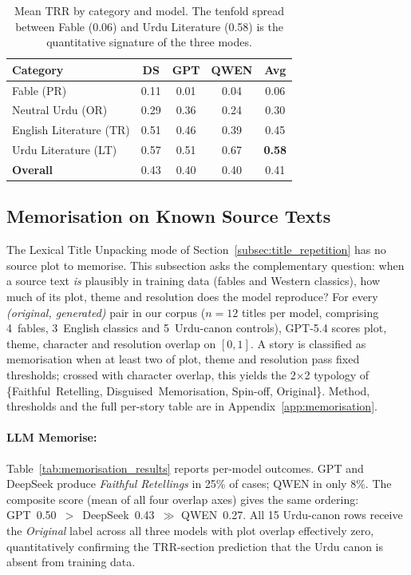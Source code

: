 \documentclass[11pt]{article}
\begin{document}
\begin{table}[ht]
\caption{Mean TRR by category and model. The tenfold spread
between Fable (0.06) and Urdu Literature (0.58) is the
quantitative signature of the three modes.}
\label{tab:trr_category}
\centering\small
\begin{tabular}{lcccc}
\hline
\textbf{Category} & \textbf{DS} & \textbf{GPT} &
\textbf{QWEN} & \textbf{Avg} \\
\hline
Fable \hfill (PR)              & 0.11 & 0.01 & 0.04 & 0.06 \\
Neutral Urdu \hfill (OR)       & 0.29 & 0.36 & 0.24 & 0.30 \\
English Literature \hfill (TR) & 0.51 & 0.46 & 0.39 & 0.45 \\
Urdu Literature \hfill (LT)    & 0.57 & 0.51 & 0.67 & \textbf{0.58} \\
\hline
\textbf{Overall}               & 0.43 & 0.40 & 0.40 & 0.41 \\
\hline
\end{tabular}
\end{table}

\subsection{Memorisation on Known Source Texts}
\label{subsec:memorization}

The Lexical Title Unpacking mode of
Section~\ref{subsec:title_repetition} has no source plot to
memorise. This subsection asks the complementary question:
when a source text \emph{is} plausibly in training data
(fables and Western classics), how much of its plot, theme
and resolution does the model reproduce? For every
\emph{(original, generated)} pair in our corpus ($n=12$
titles per model, comprising 4~fables, 3~English classics
and 5~Urdu-canon controls), GPT-5.4 
scores plot, theme, character and resolution overlap on
$[0,1]$. A story is classified as memorisation when at
least two of plot, theme and resolution pass fixed
thresholds; crossed with character overlap, this yields the
2$\times$2 typology of \{Faithful~Retelling,
Disguised~Memorisation, Spin-off, Original\}. Method,
thresholds and the full per-story table are in
Appendix~\ref{app:memorisation}.

\paragraph{LLM Memorise:}
Table~\ref{tab:memorisation_results} reports per-model
outcomes. GPT and DeepSeek produce \textit{Faithful
Retellings} in 25\% of cases; QWEN in only 8\%. The composite score (mean of all four overlap axes)
gives the same ordering: GPT~0.50~$>$~DeepSeek~0.43~$\gg$
QWEN~0.27. All 15 Urdu-canon rows receive the
\emph{Original} label across all three models with plot
overlap effectively zero, quantitatively confirming the
TRR-section prediction that the Urdu canon is absent from
training data.
\end{document}
